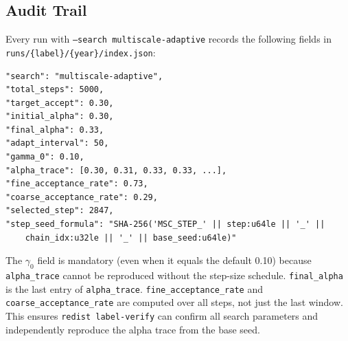 \subsection{Audit Trail}

Every run with \texttt{--search multiscale-adaptive} records the following
fields in \texttt{runs/\{label\}/\{year\}/index.json}:

\begin{verbatim}
"search": "multiscale-adaptive",
"total_steps": 5000,
"target_accept": 0.30,
"initial_alpha": 0.30,
"final_alpha": 0.33,
"adapt_interval": 50,
"gamma_0": 0.10,
"alpha_trace": [0.30, 0.31, 0.33, 0.33, ...],
"fine_acceptance_rate": 0.73,
"coarse_acceptance_rate": 0.29,
"selected_step": 2847,
"step_seed_formula": "SHA-256('MSC_STEP_' || step:u64le || '_' ||
    chain_idx:u32le || '_' || base_seed:u64le)"
\end{verbatim}

The $\gamma_0$ field is mandatory (even when it equals the default 0.10)
because \texttt{alpha\_trace} cannot be reproduced without the step-size
schedule.
\texttt{final\_alpha} is the last entry of \texttt{alpha\_trace}.
\texttt{fine\_acceptance\_rate} and \texttt{coarse\_acceptance\_rate} are
computed over all steps, not just the last window.
This ensures \texttt{redist label-verify} can confirm all search parameters
and independently reproduce the alpha trace from the base seed.

